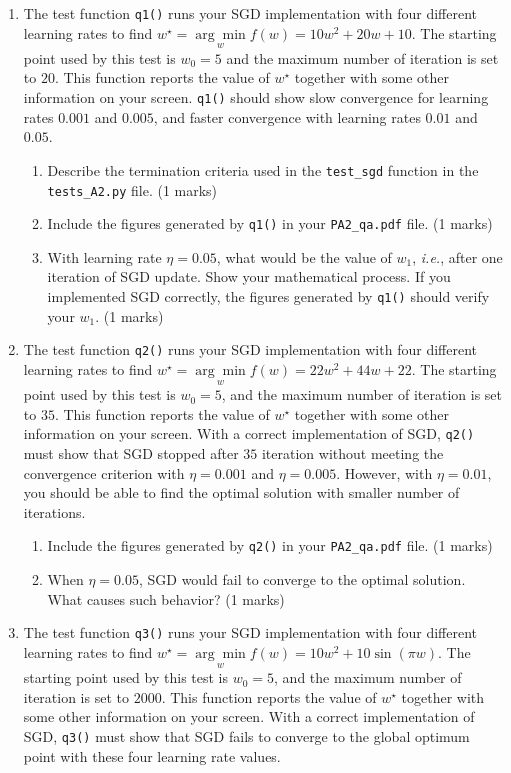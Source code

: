 \documentclass{article}
\theoremstyle{definition}
\begin{document}
\begin{enumerate}[label=\ref{partsgd}.\alph*)]
	\item The test function \verb|q1()| runs your SGD implementation with four different learning rates to find $w^\star = \underset{w}{\arg \min} f(w) = 10w^2 + 20w + 10$. The starting point used by this test is $w_0=5$ and the maximum number of iteration is set to $20$. This function reports the value of $w^\star$ together with some other information on your screen. \verb|q1()| should show slow convergence for learning rates $0.001$ and $0.005$, and faster convergence with learning rates $0.01$ and $0.05$.
	\begin{enumerate}[label=1.1.a.\roman*)]
		\item Describe the termination criteria used in the \verb|test_sgd| function in the \verb|tests_A2.py| file. (1 marks)
		\item Include the figures generated by \verb|q1()| in your \verb|PA2_qa.pdf| file. (1 marks)
		\item With learning rate $\eta=0.05$, what would be the value of $w_1$, \textit{i.e.}, after one iteration of SGD update. Show your mathematical process. If you implemented SGD correctly, the figures generated by \verb|q1()| should verify your $w_1$. (1 marks)
	\end{enumerate}
	\item The test function \verb|q2()| runs your SGD implementation with four different learning rates to find $w^\star = \underset{w}{\arg \min} f(w) = 22w^2 + 44w + 22$. The starting point used by this test is $w_0=5$, and the maximum number of iteration is set to $35$. This function reports the value of $w^\star$ together with some other information on your screen. With a correct implementation of SGD, \verb|q2()| must show that SGD stopped after $35$ iteration without meeting the convergence criterion with $\eta=0.001$ and $\eta=0.005$. However, with $\eta = 0.01$, you should be able to find the optimal solution with smaller number of iterations.
	\begin{enumerate}[label=1.2.b.\roman*)]
		\item Include the figures generated by \verb|q2()| in your \verb|PA2_qa.pdf| file. (1 marks)
		\item When $\eta=0.05$, SGD would fail to converge to the optimal solution. What causes such behavior? (1 marks)
	\end{enumerate}
	\item The test function \verb|q3()| runs your SGD implementation with four different learning rates to find $w^\star = \underset{w}{\arg \min} f(w) = 10w^2 + 10\sin(\pi w)$. The starting point used by this test is $w_0=5$, and the maximum number of iteration is set to $2000$. This function reports the value of $w^\star$ together with some other information on your screen. With a correct implementation of SGD, \verb|q3()| must show that SGD fails to converge to the global optimum point with these four learning rate values.

\end{enumerate}
\end{document}
